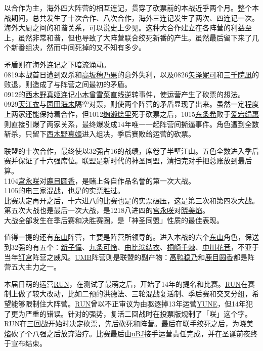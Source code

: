 以合作为主，海外四大阵营的相互连记，贯穿了砍票前的本战近乎两个月。整个本战期间，总共发生了十次合作、八次合作，海外三连记发生了两次、四连记一次。海外大厨之间的和谐关系，可以说史上少见。这种大合作建立在各阵营的利益至上，虽然非常和谐，但也导致了大阵营联合绞死新番的产生。虽然最后留下来了几个新番组决，然而中间死掉的又不知有多少。

矛盾则在海外连记之下暗流涌动。\\
0819本战首日遭到双杀和\uline{高坂穗乃果}的意外失利，以及0826\uline{矢泽妮可}和\uline{三千院凪}的败退，则造成了与阵营之间最初的矛盾。\\
0912的\uline{西木野真姬}连记\uline{小木曾雪菜}直线逆转事件，使运营产生了砍票的想法。\\
0929\uline{天江衣}与\uline{园田海未}隔空对轰，则使两个阵营的矛盾显现了出来。虽然一定程度上两家还能保持着合作，但1012\uline{绚濑绘里}死于砍票之后，1015\uline{东条希}败于\uline{爱宕绢惠}则直接引爆了两家关系，最终爆发成14年唯一一起阵营间撕逼事件。角色遭到全数斩杀，只留下\uline{西木野真姬}进入组决，季后赛败给运营的砍票。

联盟的十次合作，最终使以32强占16的战绩，席卷了半壁江山。五色全数进入季后赛并保证了十六强席位。联盟是新时代的神圣同盟，清扫完对手把总账放到最后算。\\
1104\uline{宫永咲}对\uline{鹿目圆香}，是赌上各自作品名誉的第一次大战。\\
1105的电三家混战，也是的实票胜过。\\
比赛决定再开之后，十六进八的比赛也是的实票碾压，这是第三次和第四次大战。\\
第五次大战也是最后一次大战，是1218八进四的\uline{宫永咲}对\uline{晓美焰}。\\
大战全部发生在季后赛和决胜赛圈，是「神圣同盟」性质的最佳表现。

值得一提的还有\uline{东山}阵营，主要是阵营所领导的。进入本战的六个\uline{东山}角色，保送到32强的有五个：\uline{新子憧}、\uline{九条可怜}、\uline{由比滨结衣}、\uline{桐崎千棘}、\uline{中川花音}，不亚于当年\uline{钉宫}阵营之威风。\uline{UMB}阵营则是联盟的副产物：\uline{高鸭稳乃}和\uline{鹿目圆香}都是阵营五大主力之一。

本届日萌的运营\uline{RUN}，在测试了最萌之后，开始了14年的提名和比赛。\uline{RUN}在赛制上做了较大改动，比如二预的洪德法、三轮混战复活制、季后赛和交叉分组，希望能够限制住大阵营。\uline{RUN}曾以不正审议为由驱逐掉13年运营\uline{YUNE}，但14年犯了更为严重的错误。针对的强势，复活二回战时在投票版规制了「咲」这个字。\uline{RUN}在三回战开始时决定砍票，先后砍死和阵营。最后在联手绞死之后，为\uline{晓美焰}砍了个八强之后放弃治疗。比赛最后由\uline{uBJ}接手运营责任完成，并在圣诞前夜终于宣布结束。

